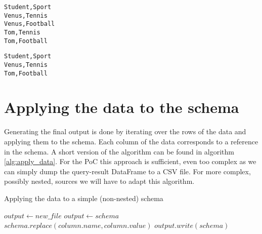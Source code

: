\begin{lstlisting}[caption={Bad join result}, label={lst:bad_join_result}, captionpos=b, basicstyle=\small]
Student,Sport
Venus,Tennis
Venus,Football
Tom,Tennis
Tom,Football
\end{lstlisting}

\begin{lstlisting}[caption={Bad join original source}, label={lst:bad_join_expected_result}, captionpos=b]
Student,Sport
Venus,Tennis
Tom,Football
\end{lstlisting}

\section{Applying the data to the schema}
\label{section:applying_data}
Generating the final output is done by iterating over the rows of the data and applying them to the schema. Each column of the data corresponds to a reference in the schema. A short version of the algorithm can be found in algorithm \ref{alg:apply_data}. For the PoC this approach is sufficient, even too complex as we can simply dump the query-result DataFrame to a CSV file. For more complex, possibly nested, sources we will have to adapt this algorithm.

\begin{algorithm}
    \caption{Applying the data to a simple (non-nested) schema}
    \label{alg:apply_data}
    \begin{algorithmic}[1]
        \State $output \gets new\_file$
            \State $output \gets schema$
                \State $schema.replace(column.name, column.value)$
            \EndFor
            \State $output.write(schema)$
        \EndFor
    \end{algorithmic}
\end{algorithm}